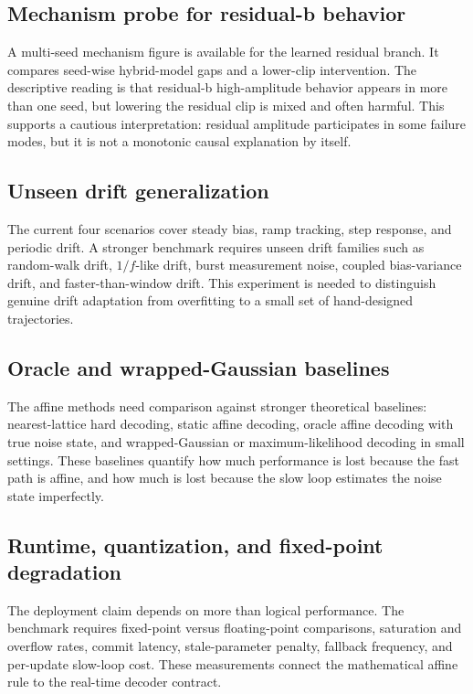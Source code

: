 \documentclass[11pt]{article}
\begin{document}
\subsection{Mechanism probe for residual-b behavior}

A multi-seed mechanism figure is available for the learned residual branch.  It
compares seed-wise hybrid-model gaps and a lower-clip intervention.  The
descriptive reading is that residual-b high-amplitude behavior appears in more
than one seed, but lowering the residual clip is mixed and often harmful.  This
supports a cautious interpretation: residual amplitude participates in some
failure modes, but it is not a monotonic causal explanation by itself.

\subsection{Unseen drift generalization}

The current four scenarios cover steady bias, ramp tracking, step response, and
periodic drift.  A stronger benchmark requires unseen drift families such as
random-walk drift, \(1/f\)-like drift, burst measurement noise, coupled
bias-variance drift, and faster-than-window drift.  This experiment is needed
to distinguish genuine drift adaptation from overfitting to a small set of
hand-designed trajectories.

\subsection{Oracle and wrapped-Gaussian baselines}

The affine methods need comparison against stronger theoretical baselines:
nearest-lattice hard decoding, static affine decoding, oracle affine decoding
with true noise state, and wrapped-Gaussian or maximum-likelihood decoding in
small settings.  These baselines quantify how much performance is lost because
the fast path is affine, and how much is lost because the slow loop estimates
the noise state imperfectly.

\subsection{Runtime, quantization, and fixed-point degradation}

The deployment claim depends on more than logical performance.  The benchmark
requires fixed-point versus floating-point comparisons, saturation and
overflow rates, commit latency, stale-parameter penalty, fallback frequency,
and per-update slow-loop cost.  These measurements connect the mathematical
affine rule to the real-time decoder contract.
\end{document}
